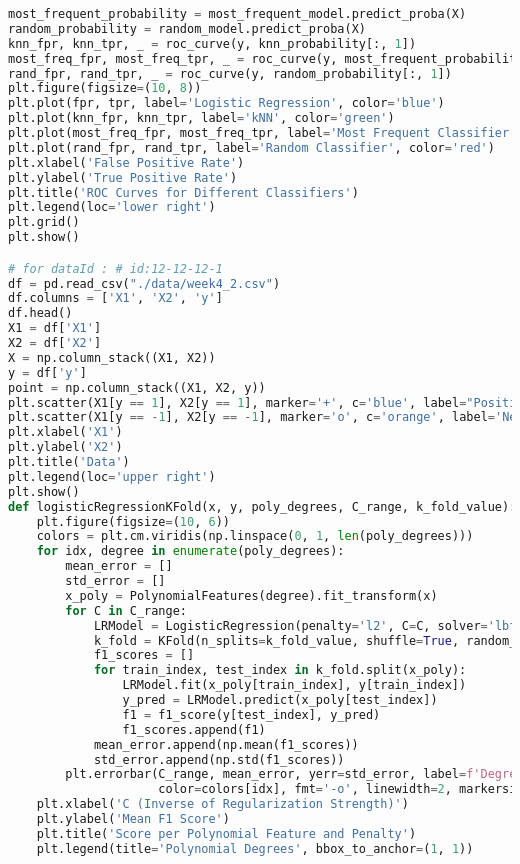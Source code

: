 \documentclass[a4paper,10pt]{article}
\begin{document}
\begin{lstlisting}[language=Python, caption={}]
most_frequent_probability = most_frequent_model.predict_proba(X)
random_probability = random_model.predict_proba(X)
knn_fpr, knn_tpr, _ = roc_curve(y, knn_probability[:, 1])
most_freq_fpr, most_freq_tpr, _ = roc_curve(y, most_frequent_probability[:, 1])
rand_fpr, rand_tpr, _ = roc_curve(y, random_probability[:, 1])
plt.figure(figsize=(10, 8))
plt.plot(fpr, tpr, label='Logistic Regression', color='blue')
plt.plot(knn_fpr, knn_tpr, label='kNN', color='green')
plt.plot(most_freq_fpr, most_freq_tpr, label='Most Frequent Classifier', color='orange')
plt.plot(rand_fpr, rand_tpr, label='Random Classifier', color='red')
plt.xlabel('False Positive Rate')
plt.ylabel('True Positive Rate')
plt.title('ROC Curves for Different Classifiers')
plt.legend(loc='lower right')
plt.grid()
plt.show()

# for dataId : # id:12-12-12-1
df = pd.read_csv("./data/week4_2.csv")
df.columns = ['X1', 'X2', 'y']
df.head()
X1 = df['X1']
X2 = df['X2']
X = np.column_stack((X1, X2))
y = df['y']
point = np.column_stack((X1, X2, y))
plt.scatter(X1[y == 1], X2[y == 1], marker='+', c='blue', label="Positive", alpha=0.8, edgecolors='w')
plt.scatter(X1[y == -1], X2[y == -1], marker='o', c='orange', label='Negative', alpha=0.8)
plt.xlabel('X1')
plt.ylabel('X2')
plt.title('Data')
plt.legend(loc='upper right')
plt.show()
def logisticRegressionKFold(x, y, poly_degrees, C_range, k_fold_value):
    plt.figure(figsize=(10, 6))
    colors = plt.cm.viridis(np.linspace(0, 1, len(poly_degrees)))
    for idx, degree in enumerate(poly_degrees):
        mean_error = []
        std_error = []
        x_poly = PolynomialFeatures(degree).fit_transform(x)
        for C in C_range:   
            LRModel = LogisticRegression(penalty='l2', C=C, solver='lbfgs', max_iter=1000)
            k_fold = KFold(n_splits=k_fold_value, shuffle=True, random_state=42)
            f1_scores = []
            for train_index, test_index in k_fold.split(x_poly):
                LRModel.fit(x_poly[train_index], y[train_index])
                y_pred = LRModel.predict(x_poly[test_index])
                f1 = f1_score(y[test_index], y_pred)
                f1_scores.append(f1)        
            mean_error.append(np.mean(f1_scores))
            std_error.append(np.std(f1_scores))
        plt.errorbar(C_range, mean_error, yerr=std_error, label=f'Degree {degree}',
                     color=colors[idx], fmt='-o', linewidth=2, markersize=6)
    plt.xlabel('C (Inverse of Regularization Strength)')
    plt.ylabel('Mean F1 Score')
    plt.title('Score per Polynomial Feature and Penalty')
    plt.legend(title='Polynomial Degrees', bbox_to_anchor=(1, 1))

\end{lstlisting}
\end{document}
